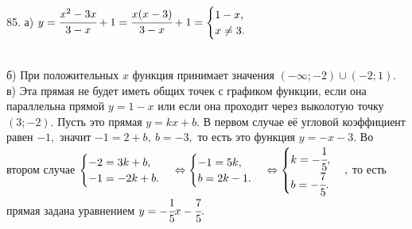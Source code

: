 85. а) $y=\cfrac{x^2-3x}{3-x}+1=\cfrac{x(x-3)}{3-x}+1=\begin{cases} 1-x,\\ x\neq 3.\end{cases}$\\
\begin{figure}[ht!]
\end{figure}\\
б) При положительных $x$ функция принимает значения $(-\infty;-2)\cup(-2;1).$\\
в) Эта прямая не будет иметь общих точек с графиком функции, если она параллельна прямой $y=1-x$ или если она проходит через выколотую точку $(3;-2).$ Пусть это прямая $y=kx+b.$ В первом случае её угловой коэффициент равен $-1,$ значит $-1=2+b,\ b=-3,$ то есть это функция $y=-x-3.$ Во втором случае $\begin{cases} -2=3k+b,\\ -1=-2k+b.\end{cases}\Leftrightarrow
\begin{cases} -1=5k,\\ b=2k-1.\end{cases}\Leftrightarrow
\begin{cases} k=-\cfrac{1}{5},\\ b=-\cfrac{7}{5}.\end{cases},$ то есть прямая задана уравнением $y=-\cfrac{1}{5}x-\cfrac{7}{5}.$\\
